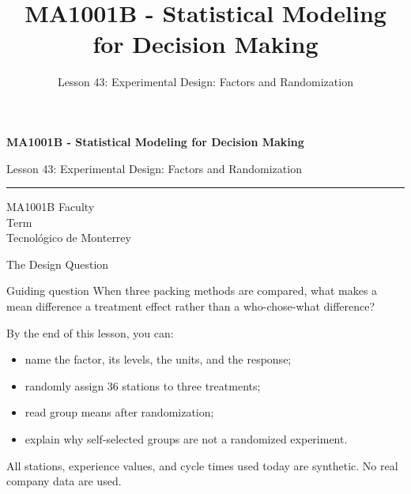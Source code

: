 \documentclass[aspectratio=169,10pt,english]{beamer}
\title{MA1001B - Statistical Modeling for Decision Making}
\subtitle{Lesson 43: Experimental Design: Factors and Randomization}
\author{}
\institute{Tecnol\'ogico de Monterrey}
\date{}
\begin{document}
\begin{frame}[plain]
  \vspace{1.2cm}
  {\Large\bfseries MA1001B - Statistical Modeling for Decision Making\par}
  \vspace{0.7cm}
  {\large Lesson 43: Experimental Design: Factors and Randomization\par}
  \vspace{0.7cm}
  {\color{TecRojo}\rule{\textwidth}{1.2pt}}
  \vspace{0.8cm}

  MA1001B Faculty\\[0.3cm]
  Term\\[0.3cm]
  Tecnol\'ogico de Monterrey
\end{frame}

\begin{frame}{The Design Question}
  \begin{alertblock}{Guiding question}
    When three packing methods are compared, what makes a mean difference a
    treatment effect rather than a who-chose-what difference?
  \end{alertblock}

  \vspace{0.6em}
  By the end of this lesson, you can:
  \begin{itemize}
    \item name the factor, its levels, the units, and the response;
    \item randomly assign 36 stations to three treatments;
    \item read group means after randomization;
    \item explain why self-selected groups are not a randomized experiment.
  \end{itemize}

  \vfill
  \scriptsize All stations, experience values, and cycle times used today are synthetic. No real company data are used.
\end{frame}
\end{document}
